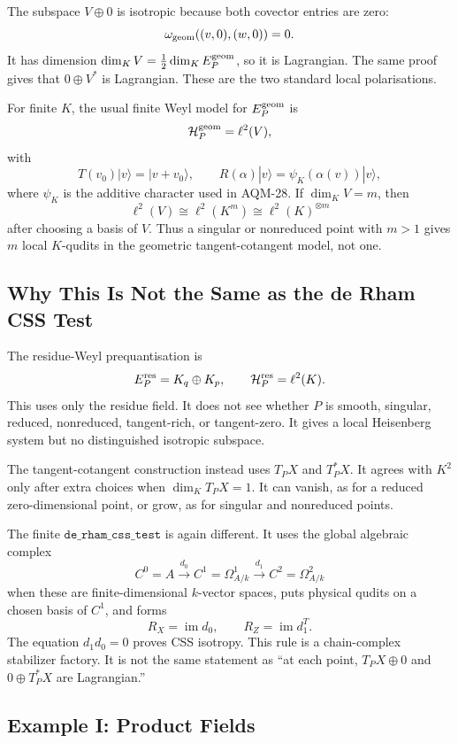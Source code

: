 The subspace \(V\oplus0\) is isotropic because both covector entries are zero:
\[
  \omega_{\rm geom}((v,0),(w,0))=0.
\]
It has dimension \(\dim_KV=\frac12\dim_KE_P^{\rm geom}\), so it is Lagrangian.
The same proof gives that \(0\oplus V^*\) is Lagrangian.  These are the two
standard local polarisations.

For finite \(K\), the usual finite Weyl model for \(E_P^{\rm geom}\) is
\[
  \mathcal H_P^{\rm geom}=\ell^2(V),
\]
with
\[
  T(v_0)|v\rangle=|v+v_0\rangle,\qquad
  R(\alpha)|v\rangle=\psi_K(\alpha(v))|v\rangle,
\]
where \(\psi_K\) is the additive character used in AQM-28.  If
\(\dim_KV=m\), then
\[
  \ell^2(V)\cong \ell^2(K^m)\cong \ell^2(K)^{\otimes m}
\]
after choosing a basis of \(V\).  Thus a singular or nonreduced point with
\(m>1\) gives \(m\) local \(K\)-qudits in the geometric tangent-cotangent model,
not one.

\subsection{Why This Is Not the Same as the de Rham CSS Test}

The residue-Weyl prequantisation is
\[
  E_P^{\rm res}=K_q\oplus K_p,\qquad \mathcal H_P^{\rm res}=\ell^2(K).
\]
This uses only the residue field.  It does not see whether \(P\) is smooth,
singular, reduced, nonreduced, tangent-rich, or tangent-zero.  It gives a local
Heisenberg system but no distinguished isotropic subspace.

The tangent-cotangent construction instead uses \(T_PX\) and \(T_P^*X\).  It
agrees with \(K^2\) only after extra choices when \(\dim_KT_PX=1\).  It can
vanish, as for a reduced zero-dimensional point, or grow, as for singular and
nonreduced points.

The finite \(\texttt{de\_rham\_css\_test}\) is again different.  It uses the
global algebraic complex
\[
  C^0=A\xrightarrow{d_0}C^1=\Omega^1_{A/k}
       \xrightarrow{d_1}C^2=\Omega^2_{A/k}
\]
when these are finite-dimensional \(k\)-vector spaces, puts physical qudits on
a chosen basis of \(C^1\), and forms
\[
  R_X=\operatorname{im}d_0,\qquad R_Z=\operatorname{im}d_1^T.
\]
The equation \(d_1d_0=0\) proves CSS isotropy.  This rule is a chain-complex
stabilizer factory.  It is not the same statement as ``at each point,
\(T_PX\oplus0\) and \(0\oplus T_P^*X\) are Lagrangian.''

\subsection{Example I: Product Fields}

